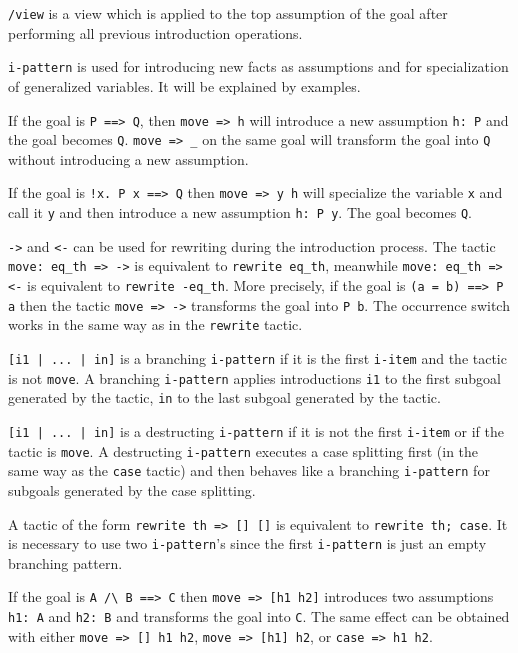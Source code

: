 \documentclass[a4paper]{article}
\begin{document}
\verb|/view| is a view which is applied to the top assumption of the goal after performing all previous introduction operations.

\verb|i-pattern| is used for introducing new facts as assumptions and for specialization of generalized variables. It will be explained by examples.

If the goal is \verb|P ==> Q|, then \verb|move => h| will introduce a new assumption \verb|h: P| and the goal becomes \verb|Q|. \verb|move => _| on the same goal will transform the goal into \verb|Q| without introducing a new assumption.

If the goal is \verb|!x. P x ==> Q| then \verb|move => y h| will specialize the variable \verb|x| and call it \verb|y| and then introduce a new assumption \verb|h: P y|. The goal becomes \verb|Q|.

\verb|->| and \verb|<-| can be used for rewriting during the introduction process. The tactic \verb|move: eq_th => ->| is equivalent to \verb|rewrite eq_th|, meanwhile \verb|move: eq_th => <-| is equivalent to \verb|rewrite -eq_th|. More precisely, if the goal is \verb|(a = b) ==> P a| then the tactic \verb|move => ->| transforms the goal into \verb|P b|. The occurrence switch works in the same way as in the \verb|rewrite| tactic.

\verb$[i1 | ... | in]$ is a branching \verb|i-pattern| if it is the first \verb|i-item| and the tactic is not \verb|move|. A branching \verb|i-pattern| applies introductions \verb|i1| to the first subgoal generated by the tactic, \verb|in| to the last subgoal generated by the tactic.

\verb$[i1 | ... | in]$ is a destructing \verb|i-pattern| if it is not the first \verb|i-item| or if the tactic is \verb|move|. A destructing \verb|i-pattern| executes a case splitting first (in the same way as the \verb|case| tactic) and then behaves like a branching \verb|i-pattern| for subgoals generated by the case splitting.

A tactic of the form \verb|rewrite th => [] []| is equivalent to \verb|rewrite th; case|. It is necessary to use two \verb|i-pattern|'s since the first \verb|i-pattern| is just an empty branching pattern.

If the goal is \verb|A /\ B ==> C| then \verb|move => [h1 h2]| introduces two assumptions \verb|h1: A| and \verb|h2: B| and transforms the goal into \verb|C|. The same effect can be obtained with either \verb|move => [] h1 h2|, \verb|move => [h1] h2|, or \verb|case => h1 h2|.
\end{document}
